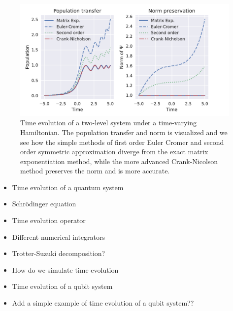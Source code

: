 \documentclass{subfiles}
\begin{document}
\begin{figure}
    \centering
    \includegraphics[width=1.0\textwidth]{figs/landau_zener_numerical_methods.pdf}
    \caption{Time evolution of a two-level system under a time-varying Hamiltonian. The population transfer and norm is visualized and we see how the simple methods of first order Euler Cromer and second order symmetric approximation diverge from the exact matrix exponentiation method, while the more advanced Crank-Nicolson method preserves the norm and is more accurate.}
\end{figure}



\begin{itemize}
    \item Time evolution of a quantum system
    \item Schrödinger equation
    \item Time evolution operator
    \item Different numerical integrators
    \item Trotter-Suzuki decomposition?
    \item How do we simulate time evolution
    \item Time evolution of a qubit system
    \item Add a simple example of time evolution of a qubit system??
\end{itemize}
\end{document}
